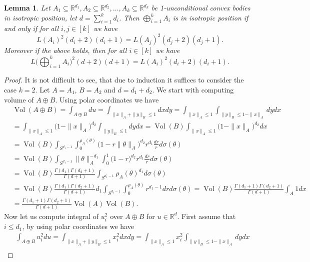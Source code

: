 \documentclass[a4paper,oneside, reqno]{amsart}
\numberwithin{equation}{section}
\newtheorem{Lem}[Thm]{Lemma}
\theoremstyle{definition}%
\theoremstyle{definition}
\theoremstyle{definition}%
\theoremstyle{definition}
\newcommand{\R}{\mathbb{R}}
\DeclareMathOperator{\Vol}{Vol}
\begin{document}
\begin{Lem} \label{isotropy of direct sum}
    Let $A_1 \subseteq \R^{d_1},A_2 \subseteq \R^{d_2}, \ldots,A_k \subseteq \R^{d_k}$ be 1-unconditional convex bodies in isotropic position, let $d= \sum_{i=1}^k d_i$. Then $\bigoplus_{i=1}^k A_i$ is in isotropic position if and only if for all $i,j \in [k]$ we have
    \[
    L(A_i)^2(d_i+2)(d_i+1)=L(A_j)^2(d_j+2)(d_j+1).
    \]
    Moreover if the above holds, then for all $i \in [k]$ we have 
    \[
    L\bigg(\bigoplus_{i=1}^k A_i \bigg)^2 (d+2)(d+1)=L(A_i)^2(d_i+2)(d_i+1).
    \]
\end{Lem}    
\begin{proof}
        It is not difficult to see, that due to induction it suffices to consider the case $k=2$. Let $A=A_1$, $B=A_2$ and $d=d_1+d_2$. We start with computing volume of $A \oplus B$.
        Using polar coordinates we have 
        \begin{align*}
         &\Vol(A \oplus B)= \int_{A \oplus B} du= \int_{\|x \|_A+ \|y \|_B \le 1} dx dy =   \int_{\|x \|_A\le 1}  \int_{\|y\|_B \le 1- \|x \|_A} dy dx \\
         & =\int_{\|x \|_A\le 1} \Big(1- \| x \|_A\Big)^{d_2}  \int_{\|y\|_B \le 1} dy dx = \Vol(B) \int_{\|x \|_A \le 1} \Big(1- \|x \|_A \Big)^{d_2} dx \\
         &= \Vol(B) \int_{S^{d_1-1}} \int_{0}^{\rho_A(\theta)} \Big(1- r \| \theta \|_A \Big)^{d_2} r^{d_1} \frac{dr}{r} d \sigma(\theta) \\
         &=\Vol(B) \int_{S^{d_1-1}} \| \theta \|_A^{-d_1} \int_0^1 \big(1-r\big)^{d_2} r^{d_1} \frac{dr}{r} d \sigma(\theta) \\
         &= \Vol(B) \frac{\Gamma(d_1)\Gamma(d_2+1)}{\Gamma(d+1)} \int_{S^{d_1-1}} \rho_A(\theta)^{d_1} d \sigma( \theta) \\
         &=\Vol(B) \frac{\Gamma(d_1)\Gamma(d_2+1)}{\Gamma(d+1)} d_1 \int_{S^{d_1-1}} \int_0^{\rho_A(\theta)} r^{d_1-1} dr d \sigma(\theta)= \Vol(B) \frac{\Gamma(d_1+1)\Gamma(d_2+1)}{\Gamma(d+1)} \int_{A} 1 dx \\
         & =\frac{\Gamma(d_1+1)\Gamma(d_2+1)}{\Gamma(d+1)} \Vol(A) \Vol(B).
        \end{align*}
        Now let us compute integral of $u_i^2$ over $A \oplus B$ for $u \in \R^d$. First assume that $i \le d_1$, by using polar coordinates we have 
        \begin{align*}
            &\int_{A \oplus B} u_i^2du= \int_{\|x \|_A+ \|y \|_B \le 1} x_i^2dx dy =   \int_{\|x \|_A\le 1} x_i^2  \int_{\|y\|_B \le 1- \|x \|_A} dy dx \\

\end{align*}
\end{proof}
\end{document}
